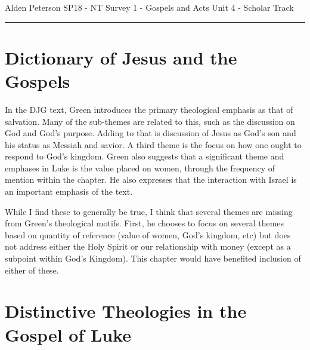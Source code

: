 \documentclass[12pt]{turabian-researchpaper}
\begin{document}
\begin{singlespace}
\noindent Alden Peterson \newline
\noindent SP18 - NT Survey 1 - Gospels and Acts\newline
\noindent Unit 4 - Scholar Track\newline
\noindent\rule{4cm}{0.4pt}
\end{singlespace}





\section{Dictionary of Jesus and the Gospels\autocite[pg. 540-552]{green2013dictionary}
}

In the DJG text, Green introduces the primary theological emphasis as that of salvation. Many of the sub-themes are related to this, such as the discussion on God and God's purpose. Adding to that is discussion of Jesus as God's son and his status as Messiah and savior. A third theme is the focus on how one ought to respond to God's kingdom. Green also suggests that a significant theme and emphases in Luke is the value placed on women, through the frequency of mention within the chapter. He also expresses that the interaction with Israel is an important emphasis of the text.

While I find these to generally be true, I think that several themes are missing from Green's theological motifs. First, he chooses to focus on several themes based on quantity of reference (value of women, God's kingdom, etc) but does not address either the Holy Spirit or our relationship with money (except as a subpoint within God's Kingdom). This chapter would have benefited inclusion of either of these.

 
 \section{Distinctive Theologies in the Gospel of Luke\autocite{biblicaltraining18}}
\end{document}
